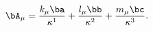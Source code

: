 \begin{equation}
\bA_{\mu}=\frac{k_{\mu}\ba}{\kappa^1}+\frac{l_{\mu}\bb}{\kappa^2}+\frac{m_{\mu}\bc}{\kappa^3}.
\label{eqn:amur}
\end{equation}

